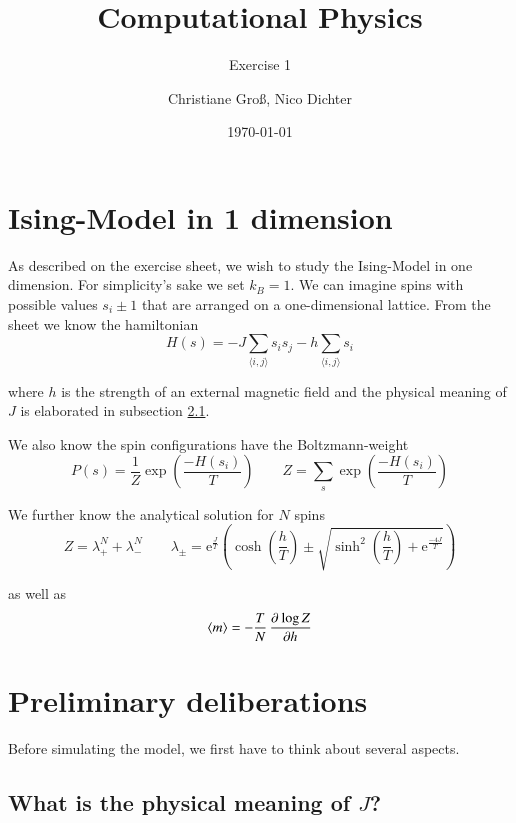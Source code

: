 \documentclass{scrartcl}
\title{Computational Physics}
\subtitle{Exercise 1}
\date{\today}
\author{Christiane Groß, Nico Dichter}
\begin{document}
	\maketitle

\section{Ising-Model in 1 dimension}
As described on the exercise sheet, we wish to study the Ising-Model in one dimension. For simplicity's sake we set $k_B=1$. We can imagine spins with possible values $s_i\pm1$ that are arranged on a one-dimensional lattice. From the sheet we know the hamiltonian
\begin{equation}
	H(s)=-J\sum_{\langle i,j\rangle }s_is_j-h\sum_{\langle i,j\rangle }s_i
	\label{eq:hamiltonianising}
\end{equation}

where $h$ is the strength of an external magnetic field and the physical meaning of $J$ is elaborated in subsection \ref{subsec:meaningJ}. 

We also know the spin configurations have the Boltzmann-weight \begin{equation}
P(s)=\frac{1}{Z}\exp\left( \frac{-H(s_i)}{T}\right) 
\qquad
Z=\sum_{s}\exp\left( \frac{-H(s_i)}{T}\right) 
\label{eq:boltzmann}
\end{equation}

We further know the analytical solution for $N$ spins
\begin{equation}
Z=\lambda_+^N+\lambda_-^N \qquad 
\lambda_{\pm}=\text{e}^{\frac{J}{T}}
\left( \cosh\left(\frac{h}{T} \right) \pm \sqrt{\sinh^2\left(\frac{h}{T} \right)+\text{e}^{\frac{-4J}{T}} }\right) 
\label{eq:zanalytical}  
\end{equation}

as well as 
\begin{equation}
\langle m\rangle =-\frac{T}{N}\dpd{\log Z}{h}
\label{eq:manalytical}  
\end{equation}

\section{Preliminary deliberations}

Before simulating the model, we first have to think about several aspects.
	
\subsection{What is the physical meaning of $J$?}
\label{subsec:meaningJ}
\end{document}
